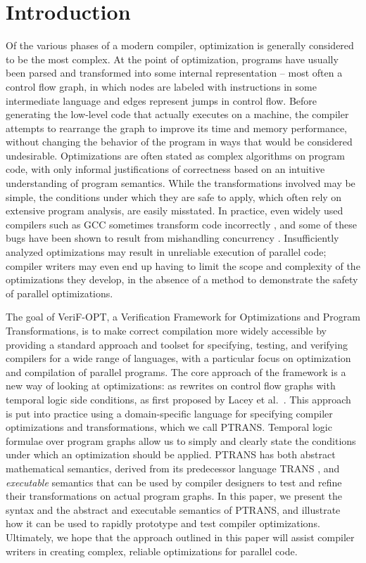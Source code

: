 \documentclass{eptcs}
\newcommand{\ptrans}[0]{PTRANS}
\begin{document}
\section{Introduction}
Of the various phases of a modern compiler, optimization is generally considered to be the most complex. At the point of optimization, programs have usually been parsed and transformed into some internal representation -- most often a control flow graph, in which nodes are labeled with instructions in some intermediate language and edges represent jumps in control flow. Before generating the low-level code that actually executes on a machine, the compiler attempts to rearrange the graph to improve its time and memory performance, without changing the behavior of the program in ways that would be considered undesirable. Optimizations are often stated as complex algorithms on program code, with only informal justifications of correctness based on an intuitive understanding of program semantics. While the transformations involved may be simple, the conditions under which they are safe to apply, which often rely on extensive program analysis, are easily misstated. In practice, even widely used compilers such as GCC sometimes transform code incorrectly \cite{csmith}, and some of these bugs have been shown to result from mishandling concurrency \cite{conccsmith}. Insufficiently analyzed optimizations may result in unreliable execution of parallel code; compiler writers may even end up having to limit the scope and complexity of the optimizations they develop, in the absence of a method to demonstrate the safety of parallel optimizations.

The goal of VeriF-OPT, a Verification Framework for Optimizations and Program Transformations, is to make correct compilation more widely accessible by providing a standard approach and toolset for specifying, testing, and verifying compilers for a wide range of languages, with a particular focus on optimization and compilation of parallel programs. The core approach of the framework is a new way of looking at optimizations: as rewrites on control flow graphs with temporal logic side conditions, as first proposed by Lacey et al.~\cite{lacey}. This approach is put into practice using a domain-specific language for specifying compiler optimizations and transformations, which we call {\ptrans}. Temporal logic formulae over program graphs allow us to simply and clearly state the conditions under which an optimization should be applied. {\ptrans} has both abstract mathematical semantics, derived from its predecessor language TRANS \cite{kalvala}, and \emph{executable} semantics that can be used by compiler designers to test and refine their transformations on actual program graphs. In this paper, we present the syntax and the abstract and executable semantics of {\ptrans}, and illustrate how it can be used to rapidly prototype and test compiler optimizations. Ultimately, we hope that the approach outlined in this paper will assist compiler writers in creating complex, reliable optimizations for parallel code.
\end{document}
